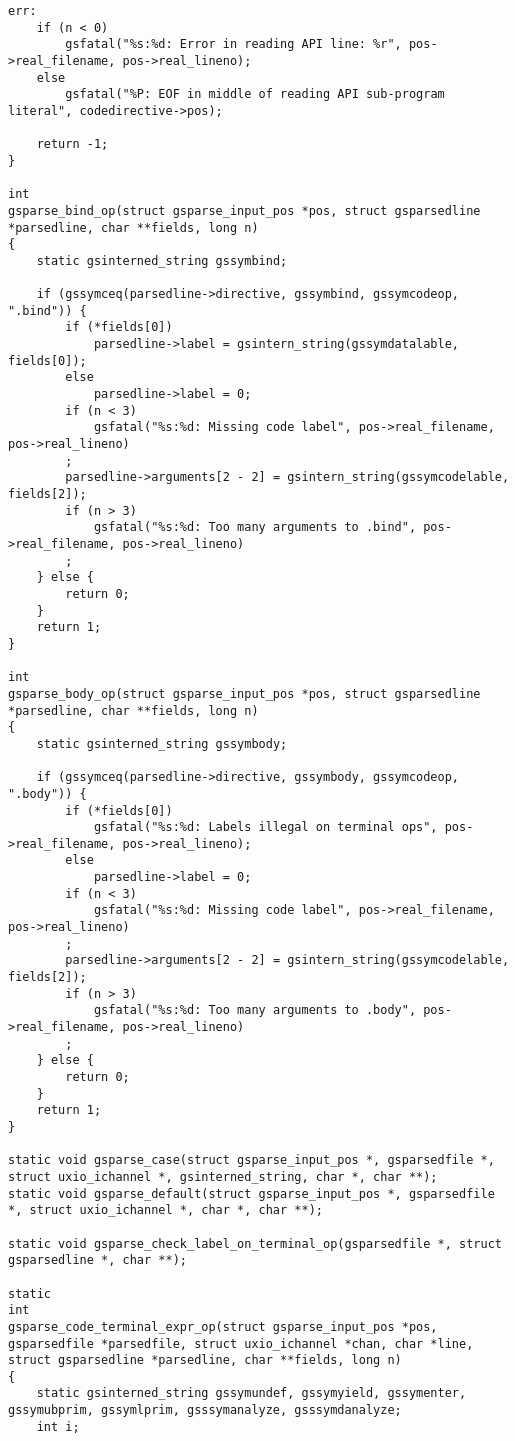 \documentclass{report}
\begin{document}
\begin{verbatim}
err:
    if (n < 0)
        gsfatal("%s:%d: Error in reading API line: %r", pos->real_filename, pos->real_lineno);
    else
        gsfatal("%P: EOF in middle of reading API sub-program literal", codedirective->pos);

    return -1;
}

int
gsparse_bind_op(struct gsparse_input_pos *pos, struct gsparsedline *parsedline, char **fields, long n)
{
    static gsinterned_string gssymbind;

    if (gssymceq(parsedline->directive, gssymbind, gssymcodeop, ".bind")) {
        if (*fields[0])
            parsedline->label = gsintern_string(gssymdatalable, fields[0]);
        else
            parsedline->label = 0;
        if (n < 3)
            gsfatal("%s:%d: Missing code label", pos->real_filename, pos->real_lineno)
        ;
        parsedline->arguments[2 - 2] = gsintern_string(gssymcodelable, fields[2]);
        if (n > 3)
            gsfatal("%s:%d: Too many arguments to .bind", pos->real_filename, pos->real_lineno)
        ;
    } else {
        return 0;
    }
    return 1;
}

int
gsparse_body_op(struct gsparse_input_pos *pos, struct gsparsedline *parsedline, char **fields, long n)
{
    static gsinterned_string gssymbody;

    if (gssymceq(parsedline->directive, gssymbody, gssymcodeop, ".body")) {
        if (*fields[0])
            gsfatal("%s:%d: Labels illegal on terminal ops", pos->real_filename, pos->real_lineno);
        else
            parsedline->label = 0;
        if (n < 3)
            gsfatal("%s:%d: Missing code label", pos->real_filename, pos->real_lineno)
        ;
        parsedline->arguments[2 - 2] = gsintern_string(gssymcodelable, fields[2]);
        if (n > 3)
            gsfatal("%s:%d: Too many arguments to .body", pos->real_filename, pos->real_lineno)
        ;
    } else {
        return 0;
    }
    return 1;
}

static void gsparse_case(struct gsparse_input_pos *, gsparsedfile *, struct uxio_ichannel *, gsinterned_string, char *, char **);
static void gsparse_default(struct gsparse_input_pos *, gsparsedfile *, struct uxio_ichannel *, char *, char **);

static void gsparse_check_label_on_terminal_op(gsparsedfile *, struct gsparsedline *, char **);

static
int
gsparse_code_terminal_expr_op(struct gsparse_input_pos *pos, gsparsedfile *parsedfile, struct uxio_ichannel *chan, char *line, struct gsparsedline *parsedline, char **fields, long n)
{
    static gsinterned_string gssymundef, gssymyield, gssymenter, gssymubprim, gssymlprim, gsssymanalyze, gsssymdanalyze;
    int i;


\end{verbatim}
\end{document}
